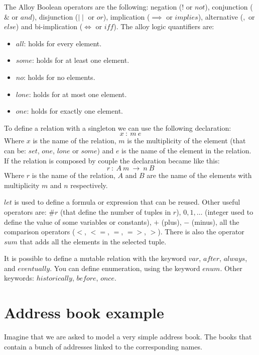 \documentclass[12pt, a4paper]{report}
\begin{document}
        The Alloy Boolean operators are the following: negation ($!$ or $not$), conjunction ($\&$ or $and$), disjunction ($\mid \mid$ or $or$), implication ($\implies$ or $implies$), alternative ($,$ or $else$) and bi-implication ($\iff$ or $iff$). The alloy logic quantifiers are: 
        \begin{itemize}
            \item $all$: holds for every element.
            \item $some$: holds for at least one element.
            \item $no$: holds for no elements.
            \item $lone$: holds for at most one element.
            \item $one$: holds for exactly one element.
        \end{itemize}
        To define a relation with a singleton we can use the following declaration: 
        \[x \: : \: m \: e\]
        Where $x$ is the name of the relation, $m$ is the multiplicity of the element (that can be: $set$, $one$, $lone$ or $some$) and $e$ is the name of the element in the relation. If the relation is composed by couple the declaration became like this: 
        \[r \: : \: A \: m \: \rightarrow \: n \: B\]
        Where $r$ is the name of the relation, $A$ and $B$ are the name of the elements with multiplicity $m$ and $n$ respectively.
         
        $let$ is used to define a formula or expression that can be reused. Other useful operators are: $\# r$ (that define the number of tuples in $r$), $0,1,\dots$ (integer used to define the value of some variables or constants), $+$ (plus), $-$ (minus), all the comparison operators ($<$, $<=$, $=$, $=>$, $>$). There is also the operator $sum$ that adds all the elements in the selected tuple. 

        It is possible to define a mutable relation with the keyword $var$, $after$, $always$, and $eventually$. You can define enumeration, using the keyword $enum$. Other keywords: 
        $historically$, $before$, $once$. 

        \section{Address book example}
        Imagine that we are asked to model a very simple address book. The books that contain a bunch of addresses linked to the corresponding names. 
        
\end{document}

